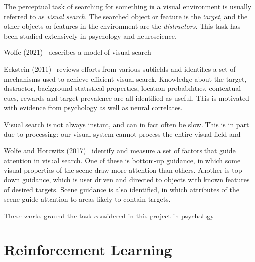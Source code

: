 
The perceptual task of searching for something in a visual environment is usually referred to as \textit{visual search}.
The searched object or feature is the \textit{target}, and the other objects or features in the environment are the \textit{distractors}.
This task has been studied extensively in psychology and neuroscience.

Wolfe (2021)~\cite{wolfe_guided_2021} describes a model of visual search


Eckstein (2011)~\cite{eckstein_visual_2011} reviews efforts from various subfields and identifies a set of mechanisms used to achieve efficient visual search.
Knowledge about the target, distractor, background statistical properties, location probabilities, contextual cues, rewards and target prevalence are all identified as useful.
This is motivated with evidence from psychology as well as neural correlates.

Visual search is not always instant, and can in fact often be slow.
This is in part due to processing: our visual system cannot process the entire visual field and 


Wolfe and Horowitz (2017)~\cite{wolfe_horowitz_2017} identify and measure a set of factors that guide attention in visual search.
One of these is bottom-up guidance, in which some visual properties of the scene draw more attention than others.
Another is top-down guidance, which is user driven and directed to objects with known features of desired targets.
Scene guidance is also identified, in which attributes of the scene guide attention to areas likely to contain targets. 

These works ground the task considered in this project in psychology.


\section{Reinforcement Learning}


